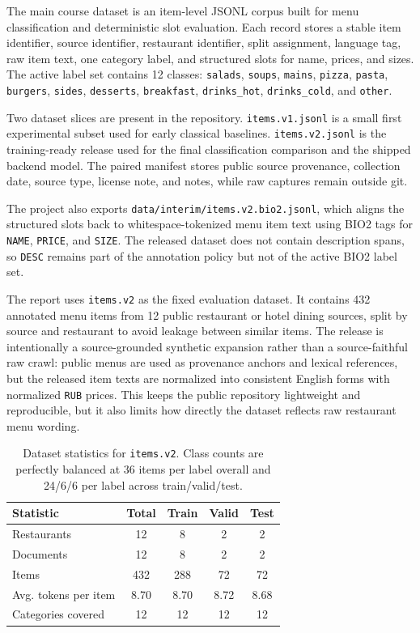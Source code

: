 \documentclass{article}
\begin{document}
The main course dataset is an item-level JSONL corpus built for menu
classification and deterministic slot evaluation. Each record stores a stable
item identifier, source identifier, restaurant identifier, split assignment,
language tag, raw item text, one category label, and structured slots for
name, prices, and sizes. The active label set contains 12 classes:
\texttt{salads}, \texttt{soups}, \texttt{mains}, \texttt{pizza},
\texttt{pasta}, \texttt{burgers}, \texttt{sides}, \texttt{desserts},
\texttt{breakfast}, \texttt{drinks\_hot}, \texttt{drinks\_cold}, and
\texttt{other}.

Two dataset slices are present in the repository. \texttt{items.v1.jsonl} is a
small first experimental subset used for early classical baselines.
\texttt{items.v2.jsonl} is the training-ready release used for the final
classification comparison and the shipped backend model. The paired manifest
stores public source provenance, collection date, source type, license note,
and notes, while raw captures remain outside git.

The project also exports \texttt{data/interim/items.v2.bio2.jsonl}, which
aligns the structured slots back to whitespace-tokenized menu item text using
BIO2 tags for \texttt{NAME}, \texttt{PRICE}, and \texttt{SIZE}. The released
dataset does not contain description spans, so \texttt{DESC} remains part of
the annotation policy but not of the active BIO2 label set.

The report uses \texttt{items.v2} as the fixed evaluation dataset. It contains
432 annotated menu items from 12 public restaurant or hotel dining sources,
split by source and restaurant to avoid leakage between similar items. The
release is intentionally a source-grounded synthetic expansion rather than a
source-faithful raw crawl: public menus are used as provenance anchors and
lexical references, but the released item texts are normalized into consistent
English forms with normalized \texttt{RUB} prices. This keeps the public
repository lightweight and reproducible, but it also limits how directly the
dataset reflects raw restaurant menu wording.

\begin{table}[t]
\centering
\small
\begin{tabular}{lcccc}
\toprule
Statistic & Total & Train & Valid & Test \\
\midrule
Restaurants & 12 & 8 & 2 & 2 \\
Documents & 12 & 8 & 2 & 2 \\
Items & 432 & 288 & 72 & 72 \\
Avg. tokens per item & 8.70 & 8.70 & 8.72 & 8.68 \\
Categories covered & 12 & 12 & 12 & 12 \\
\bottomrule
\end{tabular}
\caption{Dataset statistics for \texttt{items.v2}. Class counts are perfectly balanced at 36 items per label overall and 24/6/6 per label across train/valid/test.}
\label{tab:dataset-stats}
\end{table}
\end{document}
